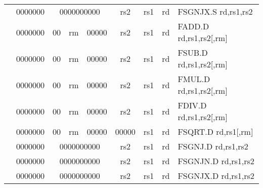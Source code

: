 \begin{table}[p]
\begin{small}
\begin{center}
\begin{tabular}{rcccccccccl}
&
\multicolumn{1}{|c|}{0000000} &
\multicolumn{5}{c|}{0000000000} &
\multicolumn{1}{c|}{rs2} &
\multicolumn{1}{c|}{rs1} &
\multicolumn{1}{c|}{rd} & FSGNJX.S rd,rs1,rs2 \\
\cline{2-10}
  

&
\multicolumn{1}{|c|}{0000000} &
\multicolumn{1}{c|}{00} &
\multicolumn{2}{c|}{rm} &
\multicolumn{2}{c|}{00000} &
\multicolumn{1}{c|}{rs2} &
\multicolumn{1}{c|}{rs1} &
\multicolumn{1}{c|}{rd} & FADD.D rd,rs1,rs2[,rm] \\
\cline{2-10}
  

&
\multicolumn{1}{|c|}{0000000} &
\multicolumn{1}{c|}{00} &
\multicolumn{2}{c|}{rm} &
\multicolumn{2}{c|}{00000} &
\multicolumn{1}{c|}{rs2} &
\multicolumn{1}{c|}{rs1} &
\multicolumn{1}{c|}{rd} & FSUB.D rd,rs1,rs2[,rm] \\
\cline{2-10}
  

&
\multicolumn{1}{|c|}{0000000} &
\multicolumn{1}{c|}{00} &
\multicolumn{2}{c|}{rm} &
\multicolumn{2}{c|}{00000} &
\multicolumn{1}{c|}{rs2} &
\multicolumn{1}{c|}{rs1} &
\multicolumn{1}{c|}{rd} & FMUL.D rd,rs1,rs2[,rm] \\
\cline{2-10}
  

&
\multicolumn{1}{|c|}{0000000} &
\multicolumn{1}{c|}{00} &
\multicolumn{2}{c|}{rm} &
\multicolumn{2}{c|}{00000} &
\multicolumn{1}{c|}{rs2} &
\multicolumn{1}{c|}{rs1} &
\multicolumn{1}{c|}{rd} & FDIV.D rd,rs1,rs2[,rm] \\
\cline{2-10}
  

&
\multicolumn{1}{|c|}{0000000} &
\multicolumn{1}{c|}{00} &
\multicolumn{2}{c|}{rm} &
\multicolumn{2}{c|}{00000} &
\multicolumn{1}{c|}{00000} &
\multicolumn{1}{c|}{rs1} &
\multicolumn{1}{c|}{rd} & FSQRT.D rd,rs1[,rm] \\
\cline{2-10}
  

&
\multicolumn{1}{|c|}{0000000} &
\multicolumn{5}{c|}{0000000000} &
\multicolumn{1}{c|}{rs2} &
\multicolumn{1}{c|}{rs1} &
\multicolumn{1}{c|}{rd} & FSGNJ.D rd,rs1,rs2 \\
\cline{2-10}
  

&
\multicolumn{1}{|c|}{0000000} &
\multicolumn{5}{c|}{0000000000} &
\multicolumn{1}{c|}{rs2} &
\multicolumn{1}{c|}{rs1} &
\multicolumn{1}{c|}{rd} & FSGNJN.D rd,rs1,rs2 \\
\cline{2-10}
  

&
\multicolumn{1}{|c|}{0000000} &
\multicolumn{5}{c|}{0000000000} &
\multicolumn{1}{c|}{rs2} &
\multicolumn{1}{c|}{rs1} &
\multicolumn{1}{c|}{rd} & FSGNJX.D rd,rs1,rs2 \\
\cline{2-10}
  


\end{tabular}
\end{center}
\end{small}
\end{table}
